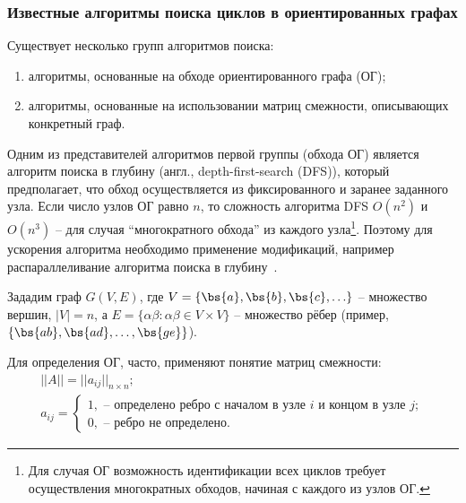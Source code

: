 \def\notedate{2021.11.14}
\def\currentauthor{Муха В. (РК6-73Б)}

\subsubsection{Известные алгоритмы поиска циклов в ориентированных графах}

Существует несколько групп алгоритмов поиска\cite{davidrajuh2016}:
\begin{enumerate}[label=\arabic*)]
    \item алгоритмы, основанные на обходе ориентированного графа (ОГ);
    \item алгоритмы, основанные на использовании матриц смежности, описывающих конкретный граф.
\end{enumerate}

Одним из представителей алгоритмов первой группы (обхода ОГ) является алгоритм поиска в глубину (англ., depth-first-search (DFS)), который предполагает, что обход осуществляется из фиксированного и заранее заданного узла. Если число узлов ОГ равно $n$, то сложность алгоритма DFS $O(n^2)$ и $O(n^3)$ -- для случая ``многократного обхода'' из каждого узла\footnote{Для случая ОГ возможность идентификации всех циклов требует осуществления многократных обходов, начиная с каждого из узлов ОГ.}. Поэтому для ускорения алгоритма необходимо применение модификаций, например распараллеливание алгоритма поиска в глубину~\cite{Mahdi2011}.

Зададим граф $G(V, E)$, где $V = \{\bs{a}, \bs{b}, \bs{c}, \ldots\}$ -- множество вершин, $|V|=n$, а $E = \{\alpha\beta: \alpha\beta\in V\times V\}$ -- множество рёбер (пример, $\{\bs{ab}, \bs{ad}, \ldots , \bs{ge}\}$).

Для определения ОГ, часто, применяют понятие матриц смежности\cite{UUU}:
\begin{equation}\label{eq.rndhpcedt.2021.11.14.01}
\begin{array}{l}
||A||=||a_{ij}||_{n\times n};\\
a_{ij}=\left\{\begin{array}{l} 1, \mbox{ -- определено ребро с началом в узле $i$ и концом в узле $j$};\\ 0, \mbox{ -- ребро не определено}.\end{array} \right.
\end{array}
\end{equation}

